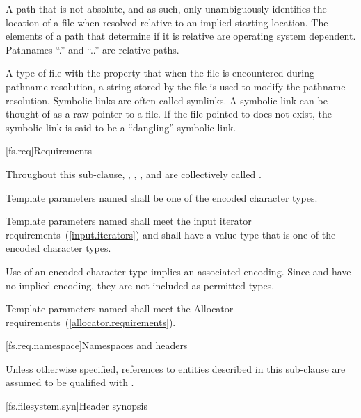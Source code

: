 A path that is not absolute, and as such, only unambiguously
identifies the location of a file when resolved relative to
an implied starting location. The elements of a path that determine if it is
relative are operating system dependent.
\enternote
Pathnames ``.'' and ``..'' are relative paths.
\exitnote

A type of file with the
property that when the file is encountered during pathname resolution, a string
stored by the file is used to modify the pathname resolution.
\enternote Symbolic links are often called symlinks. A symbolic link can be thought of as a raw pointer to a file.
If the file pointed to does not exist, the symbolic link is said to be a
``dangling'' symbolic link.\exitnote

[fs.req]{Requirements}

\pnum
Throughout this sub-clause, , ,
, and  are collectively called
.

\pnum
Template parameters named  shall be one of the
encoded character types.

\pnum
Template parameters named  shall meet the
input iterator requirements~(\ref{input.iterators}) and shall
have a value type that is one of the encoded character types.

\pnum
\enternote Use of an encoded character type implies an associated
encoding. Since  and  have no
implied encoding, they are not included as permitted types. \exitnote

\pnum
Template parameters named  shall meet the
Allocator requirements~(\ref{allocator.requirements}).

[fs.req.namespace]{Namespaces and headers}

\pnum
Unless otherwise specified, references to entities described in this
sub-clause are assumed to be qualified with .

[fs.filesystem.syn]{Header  synopsis}

